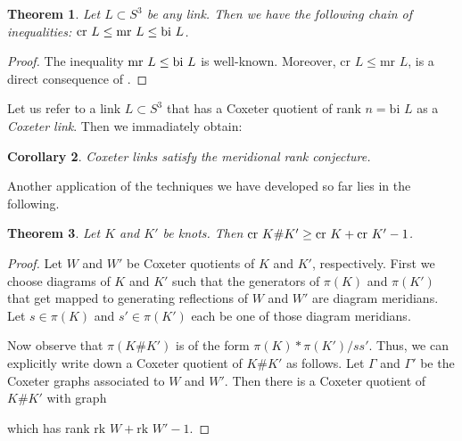 \documentclass{article}
\newtheorem{theorem}{Theorem}[section]
\newtheorem{corollary}[theorem]{Corollary}
\theoremstyle{definition}
\begin{document}
\begin{theorem}
Let $L \subset S^3$ be any link. Then we have the following chain of inequalities: $\textup{cr }L \leq \textup{mr }L \leq \textup{bi } L$.
\end{theorem}

\begin{proof}
The inequality $\textup{mr } L \leq \text{bi } L$ is well-known. Moreover, $\text{cr } L \leq \text{mr } L$, is a direct consequence of \cite[Lemma 2.1]{felikson2009}.
\end{proof}

Let us refer to a link $L \subset S^3$ that has a Coxeter quotient of rank $n = \text{bi } L$ as a \textit{Coxeter link}. Then we immadiately obtain:

\begin{corollary}\label{cor:coxeter-links-meridional-rank}
Coxeter links satisfy the meridional rank conjecture.
\end{corollary}

Another application of the techniques we have developed so far lies in the following.

\begin{theorem}\label{thm:connected-sums-coxeter-rank}
Let $K$ and $K'$ be knots. Then $\textup{cr } K\#K' \geq \textup{cr } K + \textup{cr } K' - 1$.
\end{theorem}

\begin{proof}
Let $W$ and $W'$ be Coxeter quotients of $K$ and $K'$, respectively. First we choose diagrams of $K$ and $K'$ such that the generators of $\pi(K)$ and $\pi(K')$ that get mapped to generating reflections of $W$ and $W'$ are diagram meridians. Let $s \in \pi(K)$ and $s' \in \pi(K')$ each be one of those diagram meridians.

Now observe that $\pi(K\#K')$ is of the form $\pi(K) * \pi(K') / ss'$. Thus, we can explicitly write down a Coxeter quotient of $K\#K'$ as follows. Let $\Gamma$ and $\Gamma'$ be the Coxeter graphs associated to $W$ and $W'$. Then there is a Coxeter quotient of $K\#K'$ with graph
\begin{center}
\end{center}
which has rank $\text{rk } W + \text{rk } W' - 1$. 
\end{proof}
\end{document}
